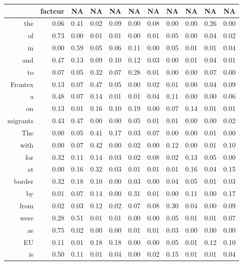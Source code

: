 \begin{longtable}{rrrrrrrrrrr}
  \hline
 & facteur & NA & NA & NA & NA & NA & NA & NA & NA & NA \\ 
  \hline
the & 0.06 & 0.41 & 0.02 & 0.09 & 0.00 & 0.08 & 0.00 & 0.00 & 0.26 & 0.00 \\ 
  of & 0.73 & 0.00 & 0.01 & 0.01 & 0.00 & 0.01 & 0.05 & 0.00 & 0.04 & 0.02 \\ 
  in & 0.00 & 0.59 & 0.05 & 0.06 & 0.11 & 0.00 & 0.05 & 0.01 & 0.01 & 0.04 \\ 
  and & 0.47 & 0.13 & 0.09 & 0.10 & 0.12 & 0.03 & 0.00 & 0.01 & 0.04 & 0.01 \\ 
  to & 0.07 & 0.05 & 0.32 & 0.07 & 0.28 & 0.01 & 0.00 & 0.00 & 0.07 & 0.00 \\ 
  Frontex & 0.13 & 0.07 & 0.47 & 0.05 & 0.00 & 0.02 & 0.01 & 0.00 & 0.04 & 0.09 \\ 
  a & 0.48 & 0.07 & 0.14 & 0.01 & 0.01 & 0.04 & 0.11 & 0.00 & 0.00 & 0.06 \\ 
  on & 0.13 & 0.01 & 0.16 & 0.10 & 0.19 & 0.00 & 0.07 & 0.14 & 0.01 & 0.01 \\ 
  migrants & 0.43 & 0.47 & 0.00 & 0.00 & 0.05 & 0.01 & 0.01 & 0.00 & 0.00 & 0.02 \\ 
  The & 0.00 & 0.05 & 0.41 & 0.17 & 0.03 & 0.07 & 0.00 & 0.00 & 0.01 & 0.00 \\ 
  with & 0.00 & 0.07 & 0.42 & 0.00 & 0.02 & 0.00 & 0.12 & 0.00 & 0.01 & 0.10 \\ 
  for & 0.32 & 0.11 & 0.14 & 0.03 & 0.02 & 0.08 & 0.02 & 0.13 & 0.05 & 0.00 \\ 
  at & 0.00 & 0.16 & 0.32 & 0.03 & 0.01 & 0.01 & 0.01 & 0.16 & 0.04 & 0.15 \\ 
  border & 0.32 & 0.18 & 0.10 & 0.00 & 0.03 & 0.00 & 0.04 & 0.05 & 0.01 & 0.03 \\ 
  by & 0.01 & 0.07 & 0.14 & 0.00 & 0.31 & 0.01 & 0.00 & 0.11 & 0.00 & 0.17 \\ 
  from & 0.02 & 0.03 & 0.12 & 0.02 & 0.07 & 0.08 & 0.30 & 0.04 & 0.00 & 0.09 \\ 
  were & 0.28 & 0.51 & 0.01 & 0.01 & 0.00 & 0.00 & 0.05 & 0.01 & 0.01 & 0.07 \\ 
  as & 0.75 & 0.02 & 0.00 & 0.00 & 0.01 & 0.01 & 0.03 & 0.00 & 0.00 & 0.00 \\ 
  EU & 0.11 & 0.01 & 0.18 & 0.18 & 0.00 & 0.00 & 0.05 & 0.01 & 0.12 & 0.10 \\ 
  is & 0.50 & 0.11 & 0.01 & 0.04 & 0.00 & 0.02 & 0.15 & 0.01 & 0.01 & 0.04 \\ 

\end{longtable}
